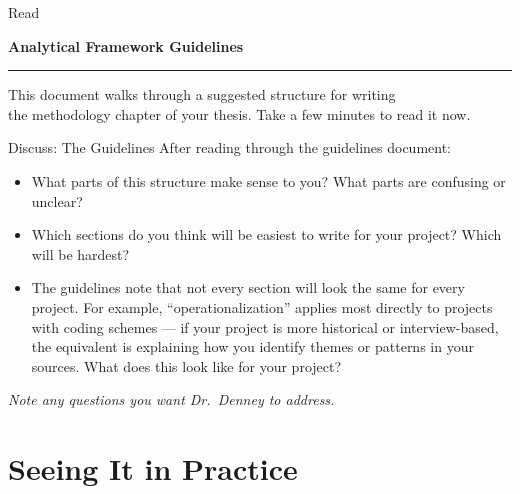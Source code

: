 \documentclass[aspectratio=169,11pt]{beamer}
\begin{document}
\begin{frame}
    \vspace{2.5cm}
    \begin{center}
        {\color{TextMuted}\large Read}
        \vspace{0.2cm}

        {\color{AccentBlue}\Large\bfseries Analytical Framework Guidelines}
        \vspace{0.3cm}

        {\color{DustyRose}\rule{3cm}{0.8pt}}
        \vspace{0.5cm}

        {\color{TextMuted}\normalsize This document walks through a suggested structure for writing\\the methodology chapter of your thesis. Take a few minutes to read it now.}
    \end{center}
\end{frame}

\begin{frame}{Discuss: The Guidelines}
    After reading through the guidelines document:
    \vspace{0.3cm}
    \begin{itemize}
        \item What parts of this structure make sense to you? What parts are confusing or unclear?
        \vspace{0.3cm}
        \item Which sections do you think will be easiest to write for your project? Which will be hardest?
        \vspace{0.3cm}
        \item The guidelines note that not every section will look the same for every project. For example, ``operationalization'' applies most directly to projects with coding schemes --- if your project is more historical or interview-based, the equivalent is explaining how you identify themes or patterns in your sources. What does this look like for your project?
    \end{itemize}
    \vspace{0.3cm}
    \textit{Note any questions you want Dr.\ Denney to address.}
\end{frame}

\section{Seeing It in Practice}
\end{document}
